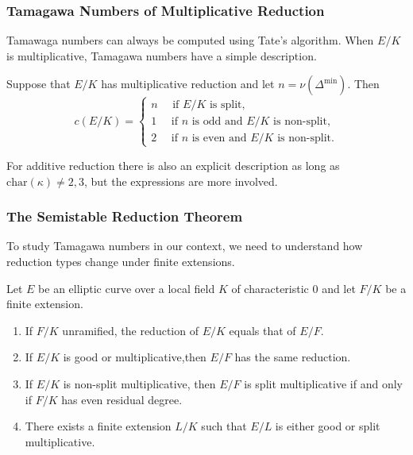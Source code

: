 \documentclass{beamer}
\theoremstyle{plain}
\begin{document}
\begin{frame}
    \frametitle{Tamagawa Numbers of Multiplicative Reduction}
    Tamawaga numbers can always be computed using Tate's algorithm. When $E/K$ is multiplicative, Tamagawa numbers have a simple description. \pause
    \begin{lemma}
        Suppose that $E/K$ has multiplicative reduction and let $n=\nu(\Delta^{\min})$. \pause Then
        \[
        c(E/K)=
        \begin{cases}
            n\quad \text{ if $E/K$ is split,}\\
            1\quad \text{ if $n$ is odd and $E/K$ is non-split,}\\
            2\quad \text{ if $n$ is even and $E/K$ is non-split.}
        \end{cases}    
        \] 
    \end{lemma}\pause

    For additive reduction there is also an explicit description as long as $\mathrm{char}(\kappa)\neq 2,3$, but the expressions are more involved.

\end{frame}

\begin{frame}
    \frametitle{The Semistable Reduction Theorem}
    To study Tamagawa numbers in our context, we need to understand how reduction types change under finite extensions.
    \begin{lemma}
        Let $E$ be an elliptic curve over a local field $K$ of characteristic $0$ and let $F/K$ be a finite extension. \pause
        \begin{enumerate}
            \item If $F/K$ unramified, the reduction of $E/K$ equals that of $E/F$.\pause
            \item If $E/K$ is good or multiplicative,then $E/F$ has the same reduction.\pause
            \item If $E/K$ is non-split multiplicative, then $E/F$ is split multiplicative if and only if $F/K$ has even residual degree. \pause
            \item There exists a finite extension $L/K$ such that $E/L$ is either good or split multiplicative.
        \end{enumerate}
    \end{lemma}    

\end{frame}
\end{document}
